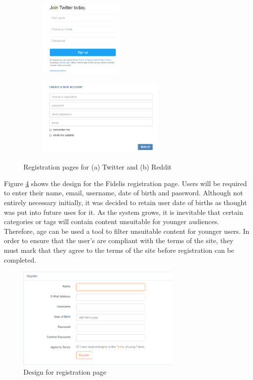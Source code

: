\begin{figure}
\centering
\begin{subfigure}[b]{.4\linewidth}
	\includegraphics[height=1.5in]{Images/Design/twitter-reg}
	\caption{}
	\label{fig:twitter-reg}
\end{subfigure}
\begin{subfigure}[b]{.5\linewidth}
	\centering
	\includegraphics[height=1.5in]{Images/Design/reddit-reg}
	\caption{}
	\label{fig:reddit-reg}
\end{subfigure}
\caption{Registration pages for (a) Twitter and (b) Reddit}
\label{fig:reg-pages}
\end{figure}

Figure \ref{fig:register-page} shows the design for the Fidelis registration page. Users will be required to enter their name, email, username, date of birth and password. Although not entirely necessary initially, it was decided to retain user date of births as thought was put into future uses for it. As the system grows, it is inevitable that certain categories or tags will contain content unsuitable for younger audiences. Therefore, age can be used a tool to filter unsuitable content for younger users. In order to ensure that the user's are compliant with the terms of the site, they must mark that they agree to the terms of the site before registration can be completed.

\begin{figure}[H]
\centering
\includegraphics[height=2in]{Images/Design/register-page}
\caption{Design for registration page}
\label{fig:register-page}
\end{figure}


